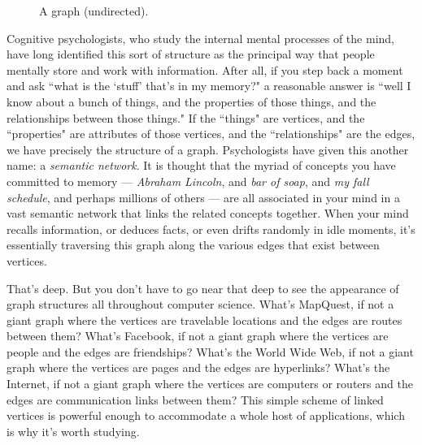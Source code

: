 \begin{figure}[ht]
\centering
{}
\caption{A graph (undirected).}
\label{graph}
\end{figure}

Cognitive psychologists, who study the internal mental processes of the
mind, have long identified this sort of structure as the principal way that
people mentally store and work with information. After all, if you step
back a moment and ask ``what is the `stuff' that's in my memory?" a
reasonable answer is ``well I know about a bunch of things, and the
properties of those things, and the relationships between those things." If
the ``things" are vertices, and the ``properties" are attributes of those
vertices, and the ``relationships" are the edges, we have precisely the
structure of a graph. Psychologists have given this another name: a
\textit{semantic network}. It is thought that the myriad of concepts you
have committed to memory --- \textsl{Abraham Lincoln}, and \textsl{bar of
soap}, and \textsl{my fall schedule}, and perhaps millions of others ---
are all associated in your mind in a vast semantic network that links the
related concepts together. When your mind recalls information, or deduces
facts, or even drifts randomly in idle moments, it's essentially traversing
this graph along the various edges that exist between vertices.

That's deep. But you don't have to go near that deep to see the appearance
of graph structures all throughout computer science. What's MapQuest, if
not a giant graph where the vertices are travelable locations and the edges
are routes between them? What's Facebook, if not a giant graph where the
vertices are people and the edges are friendships? What's the World Wide
Web, if not a giant graph where the vertices are pages and the edges are
hyperlinks? What's the Internet, if not a giant graph where the vertices
are computers or routers and the edges are communication links between
them? This simple scheme of linked vertices is powerful enough to
accommodate a whole host of applications, which is why it's worth studying.

